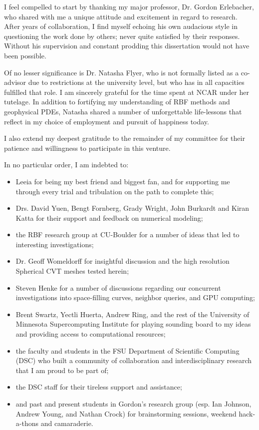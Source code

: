 \begin{acknowledgments}

I feel compelled to start by thanking my major professor, Dr. Gordon Erlebacher, who shared with me a unique attitude and excitement in regard to research. After years of collaboration, I find myself echoing his own audacious style in questioning the work done by others; never quite satisfied by their responses. Without his supervision and constant prodding this dissertation would not have been possible. %

Of no lesser significance is Dr. Natasha Flyer, who is not formally listed as a co-advisor due to restrictions at the university level, but who has in all capacities fulfilled that role. I am sincerely grateful for the time spent at NCAR under her tutelage. In addition to fortifying my understanding of RBF methods and geophysical PDEs, Natasha shared a number of unforgettable life-lessons that reflect in my choice of employment and pursuit of happiness today. 

I also extend my deepest gratitude to the remainder of my committee for their patience and willingness to participate in this venture. 

In no particular order, I am indebted to:
\begin{itemize}
\item Leeia for being my best friend and biggest fan, and for supporting me through every trial and tribulation on the path to complete this;
\item Drs. David Yuen, Bengt Fornberg, Grady Wright, John Burkardt and Kiran Katta for their support and feedback on numerical modeling;
\item the RBF research group at CU-Boulder for a number of ideas that led to interesting investigations;
\item Dr. Geoff Womeldorff for insightful discussion and the high resolution Spherical CVT meshes tested herein;
\item Steven Henke for a number of discussions regarding our concurrent investigations into space-filling curves, neighbor queries, and GPU computing;
\item Brent Swartz, Yectli Huerta, Andrew Ring, and the rest of the University of Minnesota Supercomputing Institute for playing sounding board to my ideas and providing access to computational resources;
\item the faculty and students in the FSU Department of Scientific Computing (DSC) who built a community of collaboration and interdisciplinary research that I am proud to be part of;
\item the DSC staff for their tireless support and assistance;  
\item and past and present students in Gordon's research group (esp. Ian Johnson, Andrew Young, and Nathan Crock) for brainstorming sessions, weekend hack-a-thons and camaraderie.
\end{itemize}


\end{acknowledgments}
